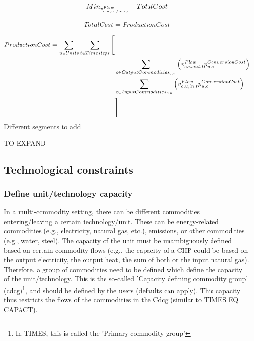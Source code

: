 \begin{align} \label{eq:objective}
Min_{\vFlow} \quad  TotalCost
\end{align}

\begin{align} \label{eq:objective_definition}
TotalCost = ProductionCost
\end{align}


\begin{align} \label{eq:production_cost}
ProductionCost = \sum_{\units} \sum_{\timesteps} \Bigg[& \nonumber \\
& \sum_{\commodity \in \OutputCommodities} \Big(\vFlow[\commodity, \unit, out, \timestep] \pConversionCost \Big) \nonumber \\
& \sum_{ \commodity \in \InputCommodities} \Big(\vFlow[\commodity, \unit, in, \timestep]\pConversionCost \Big) \nonumber \\
& \Bigg]
\end{align}
{\color{red} Different segments to add}



{\color{red} TO EXPAND}






\subsection{Technological constraints}

\subsubsection{Define unit/technology capacity}

In a multi-commodity setting, there can be different commodities entering/leaving a certain technology/unit. These can be energy-related commodities (e.g., electricity, natural gas, etc.), emissions, or other commodities (e.g., water, steel). The capacity of the unit must be unambiguously defined based on certain commodity flows (e.g., the capacity of a CHP could be based on the output electricity, the output heat, the sum of both or the input natural gas). Therefore, a group of commodities need to be defined which define the capacity of the unit/technology. This is the so-called 'Capacity defining commodity group' (cdcg)\footnote{In TIMES, this is called the 'Primary commodity group'}, and should be defined by the users (defaults can apply). This capacity thus restricts the flows of the commodities in the Cdcg (similar to TIMES EQ CAPACT).

